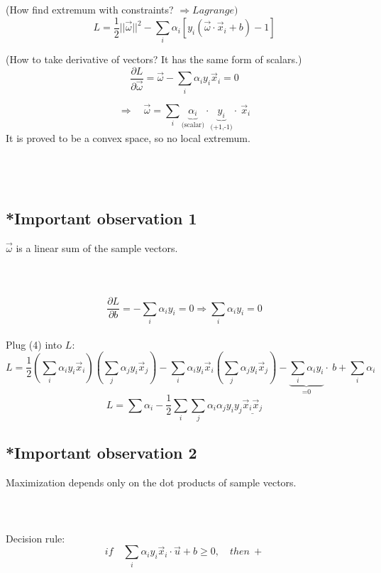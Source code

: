 \documentclass{article}
\begin{document}
(How find extremum with constraints? $\Rightarrow Lagrange)$
$$L=\frac{1}{2}||\vec{\omega}||^2-\sum_i\alpha_i [y_i(\vec{\omega}\cdot\vec{x}_i+b)-1]$$

(How to take derivative of vectors? It has the same form of scalars.)
$$\frac{\partial L}{\partial\vec{\omega}}=\vec{\omega}-\sum_i\alpha_i y_i\vec{x}_i=0$$

\begin{equation} \label{eq:someequation}
    \Rightarrow\quad\vec{\omega}=\sum_i\underbrace{\alpha_i}_\text{(scalar)}\cdot\underbrace{y_i}_\text{(+1,-1)}\cdot\ \vec{x}_i
\end{equation}
It is proved to be a convex space, so no local extremum.
\\
\\
\\
\\
\subsection{*Important observation 1}
$\vec{\omega}$ is a linear sum of the sample vectors.
\\
\\
\\
\\
$$\frac{\partial L}{\partial b}=-\sum_i \alpha_i y_i=0 \Rightarrow \sum_i \alpha_i y_i=0$$
\\
Plug (4) into $L$:
$$
L=\frac{1}{2}(\sum_i\alpha_i y_i\vec{x}_i)(\sum_j\alpha_j y_i\vec{x}_j)-\sum_i\alpha_i y_i\vec{x}_i (\sum_j\alpha_j y_i\vec{x}_j)-\underbrace{\sum_i\alpha_i y_i}_\text{=0}\cdot\ b +\sum_i\alpha_i
$$
\begin{equation} \label{eq:someequation}
    L=\sum\alpha_i-\frac{1}{2}\sum_i\sum_j\alpha_i\alpha_j y_i y_j \underline{\vec{x}_i\vec{x}_j}
\end{equation}

\subsection{*Important observation 2}
Maximization depends only on the dot products of sample vectors.
\\
\\
\\
\\
Decision rule:
$$if\quad\sum_i\alpha_i y_i\vec{x}_i\cdot\vec{u}+b\geq0,\quad then\ +$$
\end{document}
